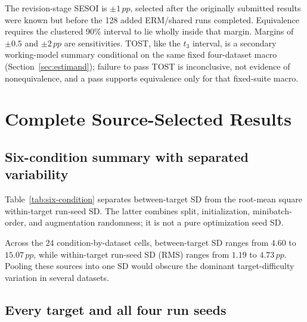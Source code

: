\documentclass[10pt]{article}
\newcommand{\pp}{\,pp}
\begin{document}
The revision-stage SESOI is $\pm1\pp$, selected after the originally submitted
results were known but before the 128 added ERM/shared runs completed.
Equivalence requires the clustered 90\% interval to lie wholly inside that
margin. Margins of $\pm0.5$ and $\pm2\pp$ are sensitivities. TOST, like the
$t_3$ interval, is a secondary working-model summary conditional on the same
fixed four-dataset macro (Section~\ref{sec:estimand}); failure to pass TOST is
inconclusive, not evidence of nonequivalence, and a pass supports equivalence
only for that fixed-suite macro.

\section{Complete Source-Selected Results}
\label{sec:complete-results}

\subsection{Six-condition summary with separated variability}

Table~\ref{tab:six-condition} separates between-target SD from the root-mean
square within-target run-seed SD. The latter combines split, initialization,
minibatch-order, and augmentation randomness; it is not a pure optimization
seed SD.

\begin{table}[H]
\centering
\caption{Source-selected accuracy and two distinct variability components.
Accuracy is the equal-target macro mean.}
\label{tab:six-condition}
\resizebox{\textwidth}{!}{%
}
\end{table}

Across the 24 condition-by-dataset cells, between-target SD ranges from
$4.60$ to $15.07\pp$, while within-target run-seed SD (RMS) ranges from
$1.19$ to $4.73\pp$. Pooling these sources into one SD would obscure the
dominant target-difficulty variation in several datasets.

\subsection{Every target and all four run seeds}

\begin{landscape}
\setlength{\tabcolsep}{4pt}
\scriptsize

\end{landscape}
\end{document}
